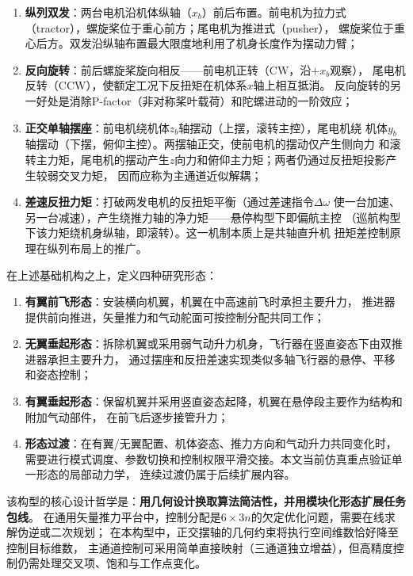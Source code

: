 \begin{enumerate}[label=(\arabic*)]
    \item \textbf{纵列双发}：两台电机沿机体纵轴（$x_b$）前后布置。前电机为拉力式
          （tractor），螺旋桨位于重心前方；尾电机为推进式（pusher），
          螺旋桨位于重心后方。双发沿纵轴布置最大限度地利用了机身长度作为摆动力臂；
    \item \textbf{反向旋转}：前后螺旋桨旋向相反——前电机正转（CW，沿$+x_b$观察），
          尾电机反转（CCW），使额定工况下反扭矩在机体系$x$轴上相互抵消。
          反向旋转的另一好处是消除P-factor（非对称桨叶载荷）和陀螺进动的一阶效应；
    \item \textbf{正交单轴摆座}：前电机绕机体$z_b$轴摆动（上摆，滚转主控），尾电机绕
          机体$y_b$轴摆动（下摆，俯仰主控）。两摆轴正交，使前电机的摆动仅产生侧向力
          和滚转主力矩，尾电机的摆动产生$z$向力和俯仰主力矩；两者仍通过反扭矩投影产生较弱交叉力矩，
          因而应称为主通道近似解耦；
    \item \textbf{差速反扭力矩}：打破两发电机的反扭矩平衡（通过差速指令$\Delta\omega$
          使一台加速、另一台减速），产生绕推力轴的净力矩——悬停构型下即偏航主控
          （巡航构型下该力矩绕机身纵轴，即滚转）。这一机制本质上是共轴直升机
          扭矩差控制原理在纵列布局上的推广。
\end{enumerate}

在上述基础机构之上，定义四种研究形态：
\begin{enumerate}[label=(\alph*)]
    \item \textbf{有翼前飞形态}：安装横向机翼，机翼在中高速前飞时承担主要升力，
          推进器提供前向推进，矢量推力和气动舵面可按控制分配共同工作；
    \item \textbf{无翼垂起形态}：拆除机翼或采用弱气动升力机身，飞行器在竖直姿态下由双推进器承担主要升力，
          通过摆座和反扭差速实现类似多轴飞行器的悬停、平移和姿态控制；
    \item \textbf{有翼垂起形态}：保留机翼并采用竖直姿态起降，机翼在悬停段主要作为结构和附加气动部件，
          在前飞后逐步接管升力；
    \item \textbf{形态过渡}：在有翼/无翼配置、机体姿态、推力方向和气动升力共同变化时，
          需要进行模式调度、参数切换和控制权限平滑交接。本文当前仿真重点验证单一形态的局部动力学，
          连续过渡仍属于后续扩展内容。
\end{enumerate}

该构型的核心设计哲学是：\textbf{用几何设计换取算法简洁性，并用模块化形态扩展任务包线}。
在通用矢量推力平台中，控制分配是$6 \times 3n$的欠定优化问题，需要在线求解伪逆或二次规划；
在本构型中，正交摆轴的几何约束将执行空间维数恰好降至控制目标维数，
主通道控制可采用简单直接映射（三通道独立增益），但高精度控制仍需处理交叉项、饱和与工作点变化。

